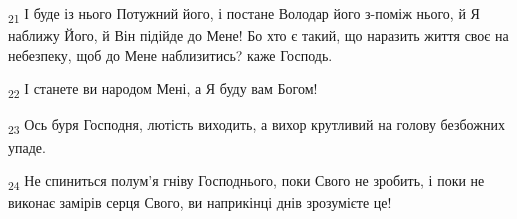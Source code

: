 \begin{tcolorbox}
\textsubscript{21} І буде із нього Потужний його, і постане Володар його з-поміж нього, й Я наближу Його, й Він підійде до Мене! Бо хто є такий, що наразить життя своє на небезпеку, щоб до Мене наблизитись? каже Господь.
\end{tcolorbox}
\begin{tcolorbox}
\textsubscript{22} І станете ви народом Мені, а Я буду вам Богом!
\end{tcolorbox}
\begin{tcolorbox}
\textsubscript{23} Ось буря Господня, лютість виходить, а вихор крутливий на голову безбожних упаде.
\end{tcolorbox}
\begin{tcolorbox}
\textsubscript{24} Не спиниться полум'я гніву Господнього, поки Свого не зробить, і поки не виконає замірів серця Свого, ви наприкінці днів зрозумієте це!
\end{tcolorbox}
